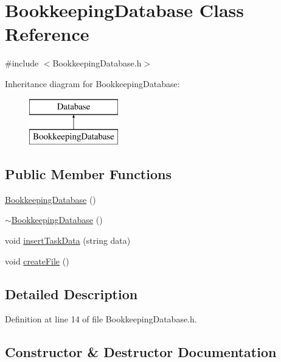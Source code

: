\hypertarget{class_bookkeeping_database}{}\section{Bookkeeping\+Database Class Reference}
\label{class_bookkeeping_database}


{\ttfamily \#include $<$Bookkeeping\+Database.\+h$>$}

Inheritance diagram for Bookkeeping\+Database\+:\begin{figure}[H]
\begin{center}
\leavevmode
\includegraphics[height=2.000000cm]{class_bookkeeping_database}
\end{center}
\end{figure}
\subsection*{Public Member Functions}
\begin{DoxyCompactItemize}
\item 
\hyperlink{class_bookkeeping_database_a1a74efb5f220809bb0e058b6d0140390}{Bookkeeping\+Database} ()
\item 
\hyperlink{class_bookkeeping_database_a90eea3eca364a7bee4de3bc4ce99061d}{$\sim$\+Bookkeeping\+Database} ()
\item 
void \hyperlink{class_bookkeeping_database_a16c4a4334e3c093df2e158f82bbbd09c}{insert\+Task\+Data} (string data)
\item 
void \hyperlink{class_bookkeeping_database_acce0f8743a2943476172fe5b3e2626e3}{create\+File} ()
\end{DoxyCompactItemize}


\subsection{Detailed Description}


Definition at line 14 of file Bookkeeping\+Database.\+h.



\subsection{Constructor \& Destructor Documentation}
\hypertarget{class_bookkeeping_database_a1a74efb5f220809bb0e058b6d0140390}{}
